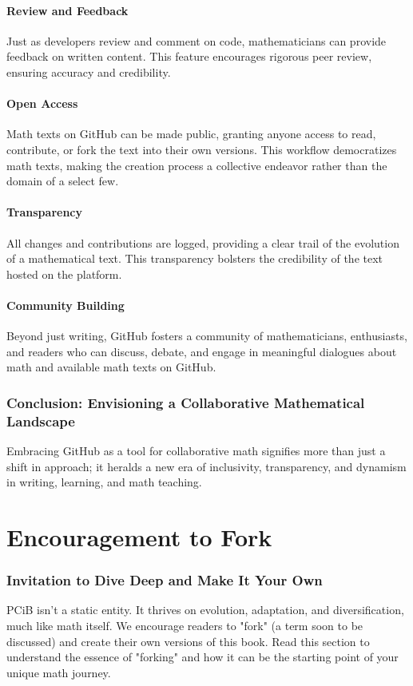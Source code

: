 \documentclass[a4paper,12pt]{book}
\begin{document}
\subsubsection*{Review and Feedback}
Just as developers review and comment on code, mathematicians can provide feedback on written content. This feature encourages rigorous peer review, ensuring accuracy and credibility.

\subsubsection*{Open Access}
Math texts on GitHub can be made public, granting anyone access to read, contribute, or fork the text into their own versions. This workflow democratizes math texts, making the creation process a collective endeavor rather than the domain of a select few.

\subsubsection*{Transparency}
All changes and contributions are logged, providing a clear trail of the evolution of a mathematical text. This transparency bolsters the credibility of the text hosted on the platform.

\subsubsection*{Community Building}
Beyond just writing, GitHub fosters a community of mathematicians, enthusiasts, and readers who can discuss, debate, and engage in meaningful dialogues about math and available math texts on GitHub.

\subsection*{Conclusion: Envisioning a Collaborative Mathematical Landscape}
Embracing GitHub as a tool for collaborative math signifies more than just a shift in approach; it heralds a new era of inclusivity, transparency, and dynamism in writing, learning, and math teaching. 

\chapter{Encouragement to Fork}
\subsection*{Invitation to Dive Deep and Make It Your Own}
PCiB isn't a static entity. It thrives on evolution, adaptation, and diversification, much like math itself. We encourage readers to "fork" (a term soon to be discussed) and create their own versions of this book. Read this section to understand the essence of "forking" and how it can be the starting point of your unique math journey.
\end{document}
